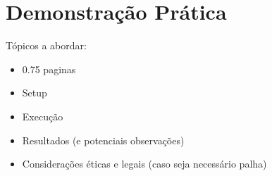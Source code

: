 \section{Demonstração Prática}
Tópicos a abordar:
\begin{itemize}
    \item 0.75 paginas
    \item Setup
    \item Execução
    \item Resultados (e potenciais observações)
    \item Considerações éticas e legais (caso seja necessário palha)
\end{itemize}

\lipsum[1-3]
